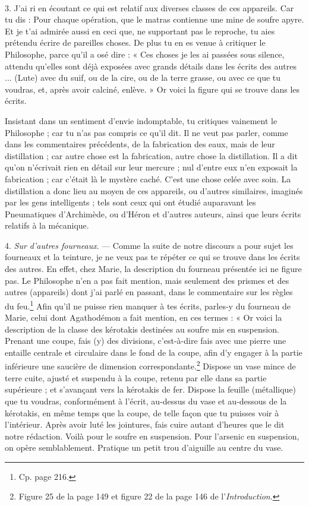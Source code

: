 \documentclass[landscape, a4paper, 11pt, oneside, polutonikogreek, french]{article}
\begin{document}
\paragraph{}
3. J'ai ri en écoutant ce qui est relatif aux diverses classes de ces appareils. Car tu dis : Pour chaque opération, que le matras contienne une mine de soufre apyre. Et je t'ai admirée aussi en ceci que, ne supportant pas le reproche, tu aies prétendu écrire de pareilles choses. De plus tu en es venue à critiquer le Philosophe, parce qu'il a osé dire : « Ces choses je les ai passées sous silence, attendu qu'elles sont déjà exposées avec grands détails dans les écrits des autres ... (Lute) avec du suif, ou de la cire, ou de la terre grasse, ou avec ce que tu voudras, et, après avoir calciné, enlève. » Or voici la figure qui se trouve dans les écrits.

Insistant dans un sentiment d'envie indomptable, tu critiques vainement le Philosophe ; car tu n'as pas compris ce qu'il dit. Il ne veut pas parler, comme dans les commentaires précédents, de la fabrication des eaux, mais de leur distillation ; car autre chose est la fabrication, autre chose la distillation. Il a dit qu'on n'écrivait rien en détail sur leur mercure ; nul d'entre eux n'en exposait la fabrication ; car c'était là le mystère caché. C'est une chose celée avec soin. La distillation a donc lieu au moyen de ces appareils, ou d'autres similaires, imaginés par les gens intelligents ; tels sont ceux qui ont étudié auparavant les Pneumatiques d'Archimède, ou d'Héron et d'autres auteurs, ainsi que leurs écrits relatifs à la mécanique.

4. \emph{Sur d'autres fourneaux}. --- Comme la suite de notre discours a pour sujet les fourneaux et la teinture, je ne veux pas te répéter ce qui se trouve dans les écrits des autres. En effet, chez Marie, la description du fourneau présentée ici ne figure pas. Le Philosophe n'en a pas fait mention, mais seulement des prismes et des autres (appareils) dont j'ai parlé en passant, dans le commentaire sur les règles du feu.\footnote{Cp. page 216.} Afin qu'il ne puisse rien manquer à tes écrits, parles-y du fourneau de Marie, celui dont Agathodémon a fait mention, en ces termes : « Or voici la description de la classe des kérotakis destinées au soufre mis en suspension. Prenant une coupe, fais (y) des divisions, c'est-à-dire fais avec une pierre une entaille centrale et circulaire dans le fond de la coupe, afin d'y engager à la partie inférieure une saucière de dimension correspondante.\footnote{Figure 25 de la page 149 et figure 22 de la page 146 de l'\emph{Introduction}.} Dispose un vase mince de terre cuite, ajusté et suspendu à la coupe, retenu par elle dans sa partie supérieure ; et s'avançant vers la kérotakis de fer. Dispose la feuille (métallique) que tu voudras, conformément à l'écrit, au-dessus du vase et au-dessous de la kérotakis, en même temps que la coupe, de telle façon que tu puisses voir à l'intérieur. Après avoir luté les jointures, fais cuire autant d'heures que le dit notre rédaction. Voilà pour le soufre en suspension. Pour l'arsenic en suspension, on opère semblablement. Pratique un petit trou d'aiguille au centre du vase.
\end{document}

